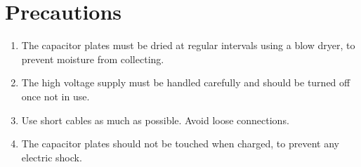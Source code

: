 \section{Precautions}
\begin{enumerate}
    \item The capacitor plates must be dried at regular intervals using a blow dryer, to prevent moisture from collecting.
    \item The high voltage supply must be handled carefully and should be turned off once not in use.
    \item Use short cables as much as possible. Avoid loose connections.
    \item The capacitor plates should not be touched when charged, to prevent any electric shock.
\end{enumerate}